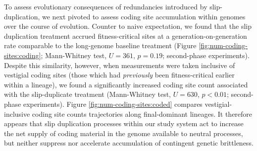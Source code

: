 To assess evolutionary consequences of redundancies introduced by slip-duplication, we next pivoted to assess coding site accumulation within genomes over the course of evolution.
Counter to naive expectation, we found that the slip duplication treatment accrued fitness-critical sites at a generation-on-generation rate comparable to the long-genome baseline treatment (Figure \ref{fig:num-coding-sites:coding}; Mann-Whitney test, $U=361$, $p=0.19$; second-phase experiments).
Despite this similarity, however, when measurements were taken inclusive of vestigial coding sites (those which had \textit{previously} been fitness-critical earlier within a lineage), we found a significantly increased coding site count associated with the slip-duplicate treatment (Mann-Whitney test, $U=630$, $p<0.01$; second-phase experiments).
Figure \ref{fig:num-coding-sites:coded} compares vestigial-inclusive coding site counts trajectories along final-dominant lineages.
It therefore appears that slip duplication processes within our study system act to increase the net supply of coding material in the genome available to neutral processes, but neither suppress nor accelerate accumulation of contingent genetic brittleness.


